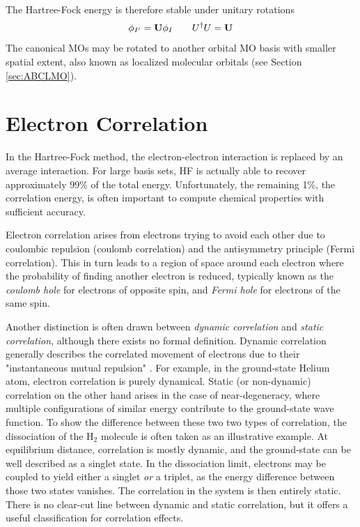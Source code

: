 The Hartree-Fock energy is therefore stable under unitary rotations
\begin{equation}
\phi_{I'} = \mathbf{U} \phi_I \qquad U^{\dagger} U = \mathbf{U}
\end{equation}
\noindent The canonical MOs may be rotated to another orbital MO basis with smaller spatial extent, also known as localized molecular orbitals (see Section \ref{sec:ABCLMO}).

\section{Electron Correlation \label{sec:CORRELATION}}

In the Hartree-Fock method, the electron-electron interaction is replaced by an average interaction. For large basis sets, HF is actually able to recover approximately 99\% of the total energy. Unfortunately, the remaining 1\%, the correlation energy, is often important to compute chemical properties with sufficient accuracy.

Electron correlation arises from electrons trying to avoid each other due to coulombic repulsion (coulomb correlation) and the antisymmetry principle (Fermi correlation). This in turn leads to a region of space around each electron where the probability of finding another electron is reduced, typically known as the \emph{coulomb hole} for electrons of opposite spin, and \emph{Fermi hole} for electrons of the same spin. 

Another distinction is often drawn between \emph{dynamic correlation} and \emph{static correlation}, although there exists no formal definition. Dynamic correlation generally describes the correlated movement of electrons due to their "instantaneous mutual repulsion" \cite{Jen2017}. For example, in the ground-state Helium atom, electron correlation is purely dynamical. Static (or non-dynamic) correlation on the other hand arises in the case of near-degeneracy, where multiple configurations of similar energy contribute to the ground-state wave function. To show the difference between these two two types of correlation, the dissociation of the H$_2$ molecule is often taken as an illustrative example. At equilibrium distance, correlation is mostly dynamic, and the ground-state can be well described as a singlet state. In the dissociation limit, electrons may be coupled to yield either a singlet \emph{or} a triplet, as the energy difference between those two states vanishes. The correlation in the system is then entirely static. There is no clear-cut line between dynamic and static correlation, but it offers a useful classification for correlation effects.

